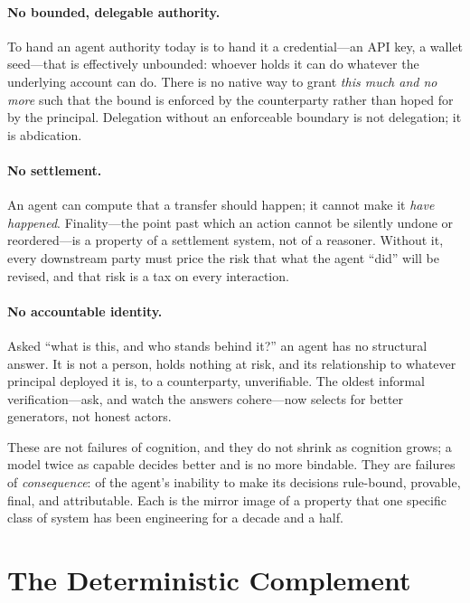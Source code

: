 \documentclass[11pt]{article}
\begin{document}
\paragraph{No bounded, delegable authority.}
To hand an agent authority today is to hand it a credential---an API key,
a wallet seed---that is effectively unbounded: whoever holds it can do
whatever the underlying account can do. There is no native way to grant
\emph{this much and no more} such that the bound is enforced by the
counterparty rather than hoped for by the principal. Delegation without
an enforceable boundary is not delegation; it is abdication.

\paragraph{No settlement.}
An agent can compute that a transfer should happen; it cannot make it
\emph{have happened}. Finality---the point past which an action cannot be
silently undone or reordered---is a property of a settlement system, not
of a reasoner. Without it, every downstream party must price the risk
that what the agent ``did'' will be revised, and that risk is a tax on
every interaction.

\paragraph{No accountable identity.}
Asked ``what is this, and who stands behind it?'' an agent has no
structural answer. It is not a person, holds nothing at risk, and its
relationship to whatever principal deployed it is, to a counterparty,
unverifiable. The oldest informal verification---ask, and watch the
answers cohere---now selects for better generators, not honest actors.

These are not failures of cognition, and they do not shrink as cognition
grows; a model twice as capable decides better and is no more bindable.
They are failures of \emph{consequence}: of the agent's inability to make
its decisions rule-bound, provable, final, and attributable. Each is the
mirror image of a property that one specific class of system has been
engineering for a decade and a half.
\section{The Deterministic Complement}
\label{sec:complement}
\end{document}
